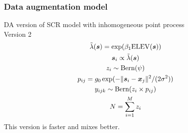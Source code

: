 \documentclass[color=usenames,dvipsnames]{beamer}\usepackage[]{graphicx}\usepackage[]{xcolor}
\begin{document}
\begin{frame}
  \frametitle{Data augmentation model}
  DA version of SCR model with inhomogeneous point process \\
  \centering
  Version 2 \\
  \begin{gather*}
    \tilde{\lambda}({\bm s}) = \exp(\beta_1 \mathrm{ELEV}({\bm s})) \\
    {\bm s}_i \propto \tilde{\lambda}({\bm s}) \\
    z_i \sim \mathrm{Bern}(\psi) \\
    p_{ij} = g_0\exp(-\|{\bm s}_i-{\bm x}_j\|^2/(2\sigma^2)) \\
    y_{ijk} \sim \mathrm{Bern}(z_i\times p_{ij}) \\
    N=\sum_{i=1}^M z_i
  \end{gather*}
  This version is faster and mixes better. \\
\end{frame}
\end{document}
